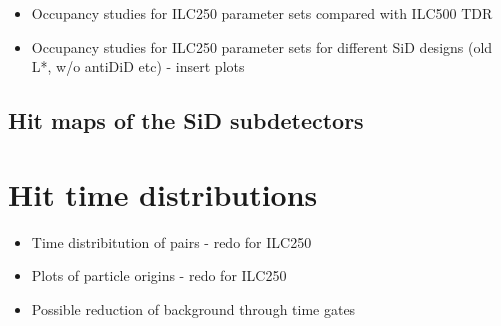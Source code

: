 \begin{itemize}
 \item Occupancy studies for ILC250 parameter sets compared with ILC500 TDR
 \item Occupancy studies for ILC250 parameter sets for different SiD designs (old L*, w/o antiDiD etc) - insert plots
\end{itemize}

\subsection{Hit maps of the SiD subdetectors}
\label{PairBkg:hitmaps}


\section{Hit time distributions}
\label{PairBkg:hittime}

\begin{itemize}
 \item Time distribitution of pairs - redo for ILC250
 \item Plots of particle origins - redo for ILC250
 \item Possible reduction of background through time gates
\end{itemize}

